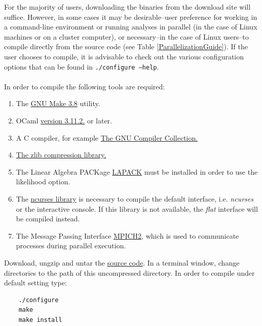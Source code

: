 For the majority of users, downloading the binaries from the \poy download site will suffice.  However, in 
some cases it may be %
 desirable--user preference for working in a command-line environment or running \poy analyses in parallel 
 (in the case of Linux machines or on a cluster computer), or necessary--in the case of Linux users--to compile \poy directly from the source code (see 
 Table %
  \ref{ParallelizationGuide}). If the user chooses to compile, it is advisable to check out the various configuration 
  options that can be found in {\tt ./configure --help}. \\
\\
In order to compile \poy the following tools are required:

\begin{enumerate}
    \item The \href{http://www.gnu.org/software/make/}{GNU Make 3.8} utility. 
    \item OCaml \href{http://www.ocaml.org}{version 3.11.2.} or later. 
    \item A C compiler, for example \href{http://gcc.gnu.org/} {The GNU Compiler Collection.}
    \item \href{http://www.zlib.net}{The zlib compression library.}
    \item The Linear Algebra PACKage \href {http://www.netlib.org/lapack/}{LAPACK} must be installed in order to 
    use the likelihood option.
    \item The \href{http://www.gnu.org/s/ncurses} {ncurses library} is necessary to compile the default interface, 
    i.e. \emph{ncurses} or the interactive console. If this library is not available, the \emph{flat} interface will be 
    compiled instead.
   \item The Message Passing Interface \href{http://www-unix.mcs.anl.gov/mpi/}{MPICH2}, which is used to communicate 
   processes during parallel execution.
\end{enumerate}
Download, ungzip and untar the \href{http://research.amnh.org/scicomp/projects/poy.php}{\poy source code}.  
In a terminal window, change directories to the path of this uncompressed directory.  
In order to compile under default setting type:
\begin{verbatim}
	./configure
	make
	make install
\end{verbatim}

